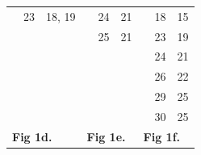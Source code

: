 \documentclass{article}
\begin{document}
\begin{table}[]
\begin{tabular}{|lllllllll|}
\multicolumn{1}{|l|}{\cellcolor[HTML]{C0C0C0}} & \multicolumn{1}{l|}{23}            & \multicolumn{1}{l|}{18, 19}      & \multicolumn{1}{l|}{\cellcolor[HTML]{C0C0C0}} & \multicolumn{1}{l|}{24}            & \multicolumn{1}{l|}{21}                & \multicolumn{1}{l|}{\cellcolor[HTML]{C0C0C0}} & \multicolumn{1}{l|}{18}            & 15                       \\ \cline{2-3}
\cellcolor[HTML]{C0C0C0}                       & \cellcolor[HTML]{C0C0C0}           & \cellcolor[HTML]{C0C0C0}         & \multicolumn{1}{l|}{\cellcolor[HTML]{C0C0C0}} & \multicolumn{1}{l|}{25}            & \multicolumn{1}{l|}{21}                & \multicolumn{1}{l|}{\cellcolor[HTML]{C0C0C0}} & \multicolumn{1}{l|}{23}            & 19                       \\ \cline{5-6}
\cellcolor[HTML]{C0C0C0}                       & \cellcolor[HTML]{C0C0C0}           & \cellcolor[HTML]{C0C0C0}         & \cellcolor[HTML]{C0C0C0}                      & \cellcolor[HTML]{C0C0C0}           & \cellcolor[HTML]{C0C0C0}               & \multicolumn{1}{l|}{\cellcolor[HTML]{C0C0C0}} & \multicolumn{1}{l|}{24}            & 21                       \\
\cellcolor[HTML]{C0C0C0}                       & \cellcolor[HTML]{C0C0C0}           & \cellcolor[HTML]{C0C0C0}         & \cellcolor[HTML]{C0C0C0}                      & \cellcolor[HTML]{C0C0C0}           & \cellcolor[HTML]{C0C0C0}               & \multicolumn{1}{l|}{\cellcolor[HTML]{C0C0C0}} & \multicolumn{1}{l|}{26}            & 22                       \\
\cellcolor[HTML]{C0C0C0}                       & \cellcolor[HTML]{C0C0C0}           & \cellcolor[HTML]{C0C0C0}         & \cellcolor[HTML]{C0C0C0}                      & \cellcolor[HTML]{C0C0C0}           & \cellcolor[HTML]{C0C0C0}               & \multicolumn{1}{l|}{\cellcolor[HTML]{C0C0C0}} & \multicolumn{1}{l|}{29}            & 25                       \\
\cellcolor[HTML]{C0C0C0}                       & \cellcolor[HTML]{C0C0C0}           & \cellcolor[HTML]{C0C0C0}         & \cellcolor[HTML]{C0C0C0}                      & \cellcolor[HTML]{C0C0C0}           & \cellcolor[HTML]{C0C0C0}               & \multicolumn{1}{l|}{\cellcolor[HTML]{C0C0C0}} & \multicolumn{1}{l|}{30}            & 25                       \\ \hline
\multicolumn{3}{|l|}{\textbf{Fig 1d.}}                                                                                 & \multicolumn{3}{l|}{\textbf{Fig 1e.}}                                                                                       & \multicolumn{3}{l|}{\textbf{Fig 1f.}}                                                                         \\ \hline

\end{tabular}
\end{table}
\end{document}
